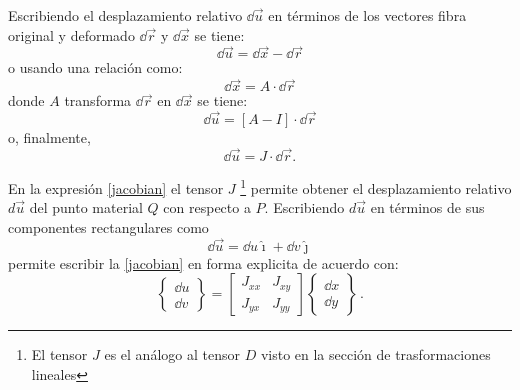 \documentclass[../notas medios.tex]{subfiles}
\begin{document}
Escribiendo el desplazamiento relativo $\dd{\vec u}$  en términos de los 
vectores fibra original y deformado $\dd{\vec{r}}$ y $\dd{\vec{x}}$  se tiene:
\[\dd{\vec u} = \dd{\vec x} - \dd{\vec r}\]
o usando una relación como:
\[\dd{\vec x} = A \cdot \dd{\vec r}\]
donde $A$ transforma $\dd{\vec{r}}$ en $\dd{\vec{x}}$ se tiene:
\[\dd{\vec u} = [A - I] \cdot \dd{\vec r}\]
o, finalmente,
\begin{equation}
\dd{\vec u} = J \cdot \dd{\vec r}.
\label{jacobian}
\end{equation}

En la expresión \cref{jacobian} el tensor $J$ \footnote{El tensor $J$ es el 
análogo al tensor $D$ visto en la sección de trasformaciones lineales} permite 
obtener el desplazamiento relativo $d\vec{u}$ del punto material $Q$ con 
respecto a $P$. Escribiendo $d\vec{u}$ en términos de sus componentes 
rectangulares como
\[\dd{\vec u} = \dd{u}\hat \imath + \dd{v}\hat \jmath\]
permite escribir la \cref{jacobian} en forma explicita de acuerdo con:
\[\begin{Bmatrix}
\dd{u}\\
\dd{v}
\end{Bmatrix} = \begin{bmatrix}
J_{xx} &J_{xy}\\
J_{yx} &J_{yy}
\end{bmatrix}\begin{Bmatrix}
\dd{x}\\
\dd{y}
\end{Bmatrix}\, .\]
\end{document}
